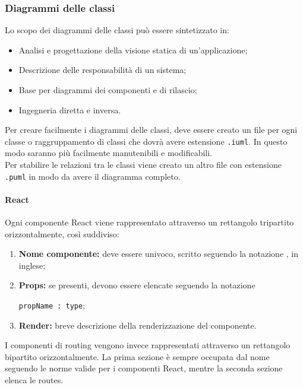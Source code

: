 \documentclass[NormeDiProgetto.tex]{subfiles}
\begin{document}
\subsubsection{Diagrammi delle classi}
Lo scopo dei diagrammi delle classi può essere sintetizzato in:
\begin{itemize}
	\item Analisi e progettazione della visione statica di un'applicazione;
	\item Descrizione delle responsabilità di un sistema;
	\item Base per diagrammi dei componenti e di rilascio;
	\item Ingegneria diretta e inversa.
\end{itemize}
Per creare facilmente i diagrammi delle classi, deve essere creato un file per ogni classe o raggruppamento di classi che dovrà avere estensione \texttt{.iuml}. In questo modo saranno più facilmente manutenibili e modificabili.\\
Per stabilire le relazioni tra le classi viene creato un altro file con estensione \texttt{.puml} in modo da avere il diagramma completo.
\paragraph{React}
Ogni componente React viene rappresentato attraverso un rettangolo tripartito orizzontalmente, così suddiviso:
\begin{enumerate}
	\item \textbf{Nome componente:} deve essere univoco, scritto seguendo la notazione , in inglese;
	\item \textbf{Props:} se presenti, devono essere elencate seguendo la notazione
	\begin{center}
		\texttt{propName : type};
	\end{center}
	\item \textbf{Render:} breve descrizione della renderizzazione del componente.
\end{enumerate}
I componenti di routing vengono invece rappresentati attraverso un rettangolo bipartito orizzontalmente. La prima sezione è sempre occupata dal nome seguendo le norme valide per i componenti React, mentre la seconda sezione elenca le routes.
\end{document}
